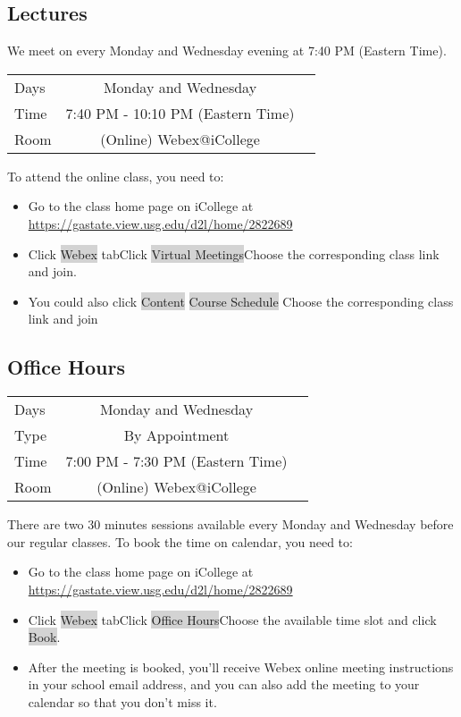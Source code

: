 \documentclass{article}
\begin{document}
\subsection{Lectures}
We meet on every Monday and Wednesday evening at 7:40 PM (Eastern Time).
\begin{center}
  \begin{tabular}{ l | c r }
    \hline			
    Days & Monday and Wednesday\\
   Time & 7:40 PM - 10:10 PM (Eastern Time) \\
    Room & (Online) Webex@iCollege\\
    \hline  
  \end{tabular}
\end{center}
\begin{flushleft}
To attend the online class, you need to:
\begin{itemize}
  \item Go to the class home page on iCollege at \url{https://gastate.view.usg.edu/d2l/home/2822689}
  \item Click \colorbox{lightgray}{Webex} tab\textrightarrow Click \colorbox{lightgray}{Virtual Meetings}\textrightarrow Choose the corresponding class link and join.
  \item You could also click \colorbox{lightgray}{Content} \colorbox{lightgray}{Course Schedule} \textrightarrow Choose the corresponding class link and join
\end{itemize}
\end{flushleft}


\subsection{Office Hours}
\begin{center}
  \begin{tabular}{ l | c r }
    \hline			
    Days & Monday and Wednesday\\
    Type & By Appointment\\
    Time & 7:00 PM - 7:30 PM (Eastern Time) \\
    Room & (Online) Webex@iCollege\\
    \hline  
  \end{tabular}
\end{center}
\begin{flushleft}
There are two 30 minutes sessions available every Monday and Wednesday before our regular classes. To book the time on calendar, you need to:
  \begin{itemize}
    \item Go to the class home page on iCollege at \url{https://gastate.view.usg.edu/d2l/home/2822689}
    \item Click \colorbox{lightgray}{Webex} tab\textrightarrow Click \colorbox{lightgray}{Office Hours}\textrightarrow Choose the available time slot and click \colorbox{lightgray}{Book}.
    \item After the meeting is booked, you'll receive Webex online meeting instructions in your school email address, and you can also add the meeting to your calendar so that you don't miss it.
  \end{itemize}
\end{flushleft}
\end{document}
